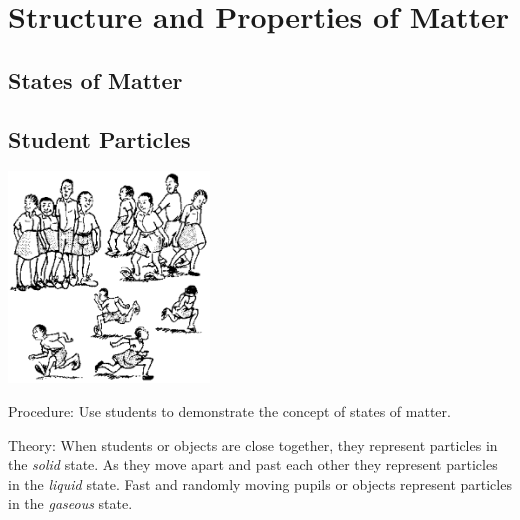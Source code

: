 \section{Structure and Properties of Matter}

\begin{multicols}{2}

\section*{States of Matter} \label{sec:states-matter}


\subsection{Student Particles}

\begin{center}
\includegraphics[width=0.4\textwidth]{./img/source/states-matter.png}
\end{center}

\begin{description*}
\item[Procedure:]{Use students to demonstrate the concept of states of matter.}
\item[Theory:]{When students or objects are close together, they represent particles in the \emph{solid} state. As they move apart and past each other they represent particles in the \emph{liquid} state. Fast and randomly moving pupils or objects represent particles in the \emph{gaseous} state.}
\end{description*}


\end{multicols}
